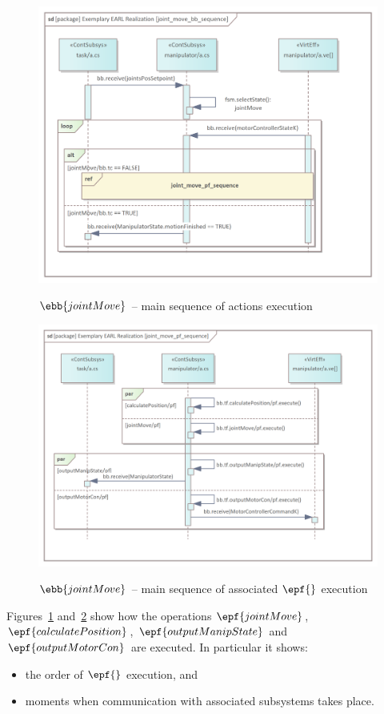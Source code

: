 \documentclass[11pt,oneside,a4paper]{article}
\begin{document}
	\begin{figure}[H]
		\centering
		\begin{center}
			{\includegraphics[width=0.7\columnwidth]{img/basic_earl_instance/joint_move_bb_sequence.png}}
		\end{center}
		\caption{$\protect\ebb{jointMove}$ -- main sequence of actions execution}
		\label{fig:joint_move_bb_sequence}
	\end{figure}

	\begin{figure}[H]
	\centering
	\begin{center}
		{\includegraphics[width=0.7\columnwidth]{img/basic_earl_instance/joint_move_pf_sequence.png}}
	\end{center}
	\caption{$\protect\ebb{jointMove}$ -- main sequence of associated $\protect\epf{}$ execution}
	\label{fig:joint_move_pf_sequence}
	\end{figure}

	Figures~\ref{fig:joint_move_bb_sequence} and~\ref{fig:joint_move_pf_sequence} show how the operations $\epf{jointMove}$, $\epf{calculatePosition}$, $\epf{outputManipState}$ and $\epf{outputMotorCon}$ are executed. In particular it shows:
	\begin{itemize}
		\item the order of $\epf{}$ execution, and
		\item moments when communication with associated subsystems takes place.
	\end{itemize}
	
\end{document}
